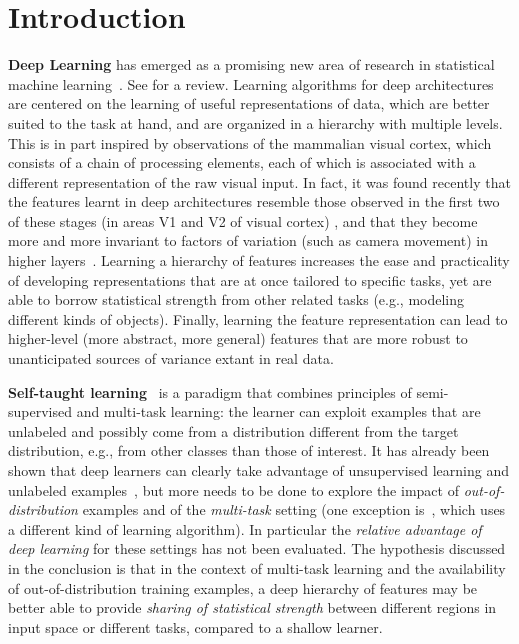 \documentclass{article} %
\begin{document}
\section{Introduction}
\vspace*{-1mm}

{\bf Deep Learning} has emerged as a promising new area of research in
statistical machine learning~\citep{Hinton06,ranzato-07-small,Bengio-nips-2006,VincentPLarochelleH2008,ranzato-08,TaylorHintonICML2009,Larochelle-jmlr-2009,Salakhutdinov+Hinton-2009,HonglakL2009,HonglakLNIPS2009,Jarrett-ICCV2009,Taylor-cvpr-2010}. See \citet{Bengio-2009} for a review.
Learning algorithms for deep architectures are centered on the learning
of useful representations of data, which are better suited to the task at hand,
and are organized in a hierarchy with multiple levels.
This is in part inspired by observations of the mammalian visual cortex, 
which consists of a chain of processing elements, each of which is associated with a
different representation of the raw visual input. In fact,
it was found recently that the features learnt in deep architectures resemble
those observed in the first two of these stages (in areas V1 and V2
of visual cortex) \citep{HonglakL2008}, and that they become more and
more invariant to factors of variation (such as camera movement) in
higher layers~\citep{Goodfellow2009}.
Learning a hierarchy of features increases the
ease and practicality of developing representations that are at once
tailored to specific tasks, yet are able to borrow statistical strength
from other related tasks (e.g., modeling different kinds of objects). Finally, learning the
feature representation can lead to higher-level (more abstract, more
general) features that are more robust to unanticipated sources of
variance extant in real data.

{\bf Self-taught learning}~\citep{RainaR2007} is a paradigm that combines principles
of semi-supervised and multi-task learning: the learner can exploit examples
that are unlabeled and possibly come from a distribution different from the target
distribution, e.g., from other classes than those of interest. 
It has already been shown that deep learners can clearly take advantage of
unsupervised learning and unlabeled examples~\citep{Bengio-2009,WestonJ2008-small},
but more needs to be done to explore the impact
of {\em out-of-distribution} examples and of the {\em multi-task} setting
(one exception is~\citep{CollobertR2008}, which uses a different kind
of learning algorithm). In particular the {\em relative
advantage of deep learning} for these settings has not been evaluated.
The hypothesis discussed in the conclusion is that in the context of 
multi-task learning and the availability of out-of-distribution training examples, 
a deep hierarchy of features
may be better able to provide {\em sharing of statistical strength}
between different regions in input space or different tasks, compared to
a shallow learner.
\end{document}
